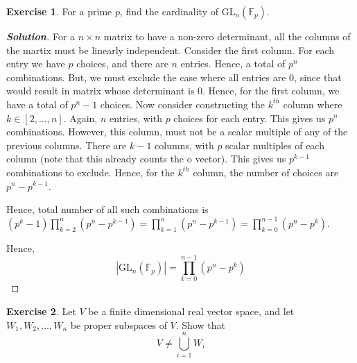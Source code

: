 \documentclass[10pt]{scrartcl}
\theoremstyle{definition}
\newtheorem{exercise}{Exercise}
\newenvironment{solution} {\begin{proof}[\normalfont \textbf{Solution}]} {\end{proof}}
\begin{document}
\begin{exercise}
    For a prime $p$, find the cardinality of $\text{GL}_n(\mathbb{F}_p)$.
\end{exercise}
\begin{solution}
    For a $n \times n$ matrix to have a non-zero determinant, all the columns of the martix must be linearly independent.
    Consider the first column. For each entry we have $p$ choices, and there are $n$ entries. Hence, a total of $p^n$ combinations. But,
    we must exclude the case where all entries are 0, since that would result in matrix whose determinant is 0. Hence, for the first column,
    we have a total of $p^n - 1$ choices. Now consider constructing the $k^{th}$ column where $k \in [2, \dots ,n]$.
    Again, $n$ entries, with $p$ choices for each entry. This gives us $p^n$ combinations.
    However, this column, must not be a scalar multiple of any of the previous columns. 
    There are $k -1$ columns, with $p$ scalar multiples of each column (note that this already counts the o vector). This gives us $p^{k-1}$ combinations to exclude.
    Hence, for the  $k^{th}$ column, the number of choices are $p^n - p^{k-1}$.

    Hence, total number of all such combinations is $(p^k - 1)\prod_{k = 2}^n (p^n - p^{k-1}) = \prod_{k = 1}^n (p^n - p^{k-1})=\prod_{k = 0}^{n-1} (p^n - p^k)$.

    Hence, $$|\text{GL}_n{(\mathbb{F}_p)}| = \prod_{k=0}^{n-1} (p^n - p^k)$$
\end{solution}
\begin{exercise}
        Let $V$ be a finite dimensional real vector space, and let $W_1, W_2, \dots , W_n$ be proper subspaces of $V$. Show that
        $$V \neq \bigcup_{i=1}^n W_i$$
\end{exercise}
\end{document}
